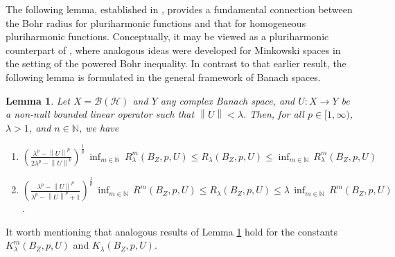 \documentclass[a4paper,11pt, reqno]{amsart}
\newtheorem{lem}{Lemma}[section]
\theoremstyle{definition}
\newtheorem{rem}{Remark}[section]
\newcommand{\real}{{\operatorname{Re}\,}}
\newcommand{\norm}[1]{\left\lVert#1\right\rVert}
\newcommand{\comment}[1]{}
\begin{document}
	\comment{\begin{lem}
			Let $f(z)=\sum_{m=0}^{\infty}\sum_{|\alpha|=m} a_{\alpha}\, z^{\alpha} + \sum_{m=1}^{\infty}\sum_{|\beta|=m} b^{*}_{\alpha}\, \bar{z}^{\alpha} \in \mathcal{PH}_{n}$. Then for all $m\geq 1$, we have
			\begin{equation} \label{e-homo-coeff-33}
				\norm{\sum_{|\alpha|=m}(a_{\alpha}+b_{\alpha})\, z^{\alpha}} \leq 4 \norm{I-\real(a_{0})}\, \norm{P}_{\infty},
			\end{equation}
			and
			\begin{equation} \label{e-homo-coeff-4}
				\norm{\sum_{|\alpha|=m}(a_{\alpha}-b_{\alpha})\, z^{\alpha}} \leq 4 \norm{I-\real(a_{0})}\, \norm{P}_{\infty}.
			\end{equation}
		\end{lem}
	}
	The following lemma, established in \cite{Himadri-local-Banach-1}, provides a fundamental connection between the Bohr radius for pluriharmonic functions and that for homogeneous pluriharmonic functions. Conceptually, it may be viewed as a pluriharmonic counterpart of \cite[Lemma 3.2]{defant-2012}, where analogous ideas were developed for Minkowski spaces in the setting of the powered Bohr inequality. In contrast to that earlier result, the following lemma is formulated in the general framework of Banach spaces.
	\begin{lem} \cite{Himadri-local-Banach-1} \label{lem-3.3}
		Let $X=\mathcal{B}(\mathcal{H})$ and $Y$ any complex Banach space, and $U: X \rightarrow Y$ be a non-null bounded linear operator such that $\norm{U}< \lambda$. Then, for all $p\in[1,\infty)$, $\lambda>1$, and $n \in \mathbb{N}$, we have
		\begin{enumerate}
			\item $\left(\frac{\lambda^p - \norm{U}^p}{2\lambda^p - \norm{U}^p}\right)^{\frac{1}{p}}\, \inf_{m\in \mathbb{N}}\, R^{m}_{\lambda}(B_{Z}, p,U) \leq R_{\lambda}(B_{Z}, p,U) \leq \inf_{m\in \mathbb{N}}\, R^{m}_{\lambda}(B_{Z}, p,U)$
			
			\item $\left(\frac{\lambda^p - \norm{U}^p}{\lambda^p - \norm{U}^p +1}\right)^{\frac{1}{p}}\, \inf_{m\in \mathbb{N}}\, R^{m}(B_{Z}, p,U) \leq R_{\lambda}(B_{Z}, p,U) \leq \lambda \, \inf_{m\in \mathbb{N}}\, R^{m}(B_{Z}, p,U)$.
		\end{enumerate}
	\end{lem}
	It worth mentioning that analogous results of Lemma \ref{lem-3.3} hold for the constants $K^m_{\lambda}(B_{Z}, p,U)$ and $K_{\lambda}(B_{Z}, p,U)$.
	\vspace{1mm}
	
\end{document}
